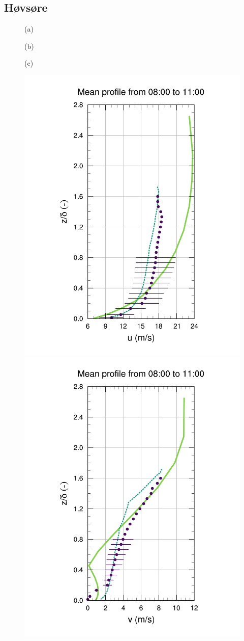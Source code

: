  \subsection{Høvsøre}
\begin{figure}[H]
	\begin{minipage}{0.33\linewidth}
		\centering \hspace{1.5cm}(a)
	\end{minipage}%
	\begin{minipage}{0.33\linewidth}
		\centering \hspace{1cm}(b)
	\end{minipage}%
	\begin{minipage}{0.33\linewidth}
		\centering \hspace{1cm}(c)
	\end{minipage}%
	\vspace{-3mm}
	\begin{center}
		\includegraphics[height=0.62\linewidth,page=37,trim={35mm 10mm 41mm 25mm},clip]{Imagenes/06/hov/9u}%
		\includegraphics[height=0.62\linewidth,page=37,trim={48mm 10mm 41mm 25mm},clip]{Imagenes/06/hov/9v}%

\end{center}
\end{figure}
